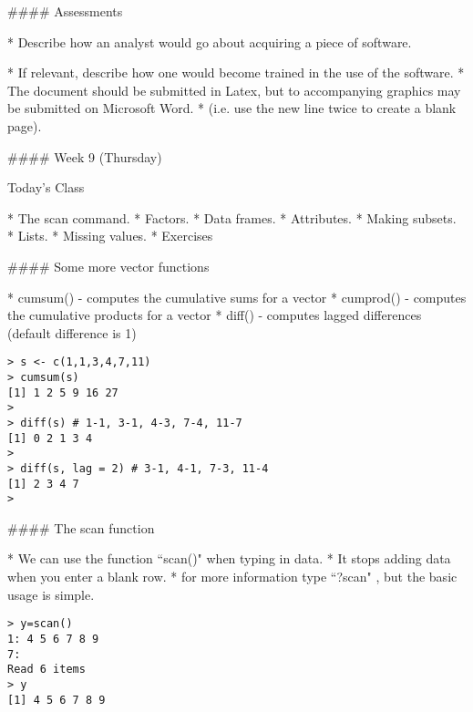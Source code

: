 
#### {Assessments}
\begin{itemize}

* Describe how an analyst would go about acquiring a piece of software.

* If relevant, describe how one would become trained in the use of the software.
* The document should be submitted in Latex, but to accompanying graphics may be submitted on Microsoft Word.
* (i.e. use the new line twice to create a blank page).
\end{itemize}

#### {Week 9 (Thursday)}

Today's Class

\begin{itemize}
    * The scan command.
    * Factors.
    * Data frames.
    * Attributes.
    * Making subsets.
    * Lists.
    * Missing values.
    * Exercises
\end{itemize}


#### {Some more vector functions}
\begin{itemize}
* cumsum()  - computes the cumulative sums for a vector
* cumprod() - computes the cumulative products for a vector
* diff()  - computes lagged  differences (default difference is 1)

\begin{verbatim}
> s <- c(1,1,3,4,7,11)
> cumsum(s)
[1] 1 2 5 9 16 27
>
> diff(s) # 1-1, 3-1, 4-3, 7-4, 11-7
[1] 0 2 1 3 4
>
> diff(s, lag = 2) # 3-1, 4-1, 7-3, 11-4
[1] 2 3 4 7
>
\end{verbatim}
\end{itemize}





#### {The scan function}
\begin{itemize}
* We can use the function  ``scan()" when typing in data.
* It stops adding data when you enter a blank row.
* for more information type ``?scan" , but the basic usage is simple.

\begin{verbatim}
> y=scan()
1: 4 5 6 7 8 9
7:
Read 6 items
> y
[1] 4 5 6 7 8 9
\end{verbatim}
\end{itemize}



